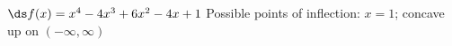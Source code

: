 {$\ds f(x) = x^4-4x^3+6x^2-4x+1$
}
{Possible points of inflection: $x=1$;
concave up on $(-\infty,\infty)$
}
